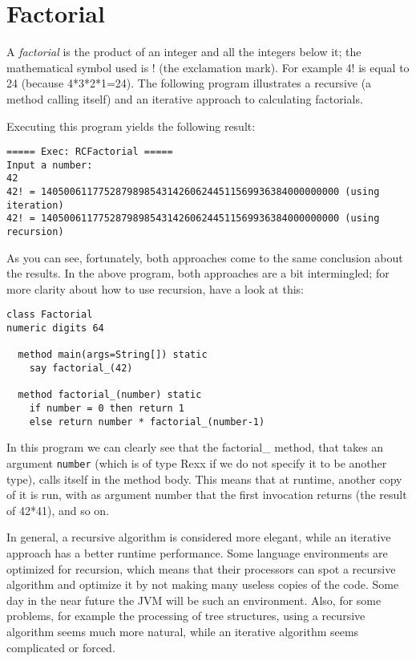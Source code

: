 {\section{Factorial}
A \emph{factorial} is the product of an integer and all the integers
below it; the mathematical symbol used is ! (the exclamation mark). For
example 4! is equal to 24 (because 4*3*2*1=24). The
following program illustrates a recursive (a method calling itself)
and an iterative approach to calculating factorials.

Executing this program yields the following result:
\begin{verbatim}
===== Exec: RCFactorial =====
Input a number: 
42
42! = 1405006117752879898543142606244511569936384000000000 (using iteration)
42! = 1405006117752879898543142606244511569936384000000000 (using recursion)
\end{verbatim}
As you can see, fortunately, both approaches come to the same
conclusion about the results. In the above program, both
approaches are a bit intermingled; for more clarity about how to use
recursion, have a look at this:
\begin{lstlisting}[label=factorialrecursive, caption=Factorial Recursive]
class Factorial
numeric digits 64

  method main(args=String[]) static
    say factorial_(42)

  method factorial_(number) static
    if number = 0 then return 1
    else return number * factorial_(number-1)

\end{lstlisting}
In this program we can clearly see that the factorial\_ method, that
takes an argument \texttt{number} (which is of type Rexx if we do not
specify it to be another type), calls itself in the method body. This
means that at runtime, another copy of it is run, with as argument
number that the first invocation returns (the result of 42*41), and so
on.

In general, a recursive algorithm is considered more elegant, while an
iterative approach has a better runtime performance. Some language
environments are optimized for recursion, which means that their
processors can spot a recursive algorithm and optimize it by not
making many useless copies of the code. Some day in the near future
the JVM will be such an environment. Also, for some problems, for example
the processing of tree structures, using a recursive algorithm seems
much more natural, while an iterative algorithm seems complicated or forced.
}
